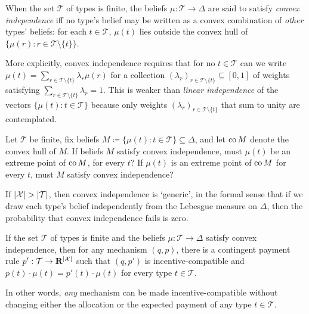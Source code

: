 \begin{definition}
	\label{definition:convex_indep}
	When the set $\mathcal{T}$ of types is finite,
	the beliefs $\mu : \mathcal{T} \to \Delta$
	are said to satisfy \emph{convex independence}
	iff no type's belief may be written as a convex combination of \emph{other} types' beliefs:
	for each $t \in \mathcal{T}$, $\mu(t)$ lies outside the convex hull of $\{ \mu(r) : r \in \mathcal{T} \setminus \{t\} \}$.
\end{definition}

More explicitly, convex independence requires that
for no $t \in \mathcal{T}$
can we write $\mu(t) = \sum_{r \in \mathcal{T} \setminus \{t\}} \lambda_r \mu(r)$
for a collection $( \lambda_r )_{r \in \mathcal{T} \setminus \{t\}} \subseteq [0,1]$ of weights satisfying $\sum_{r \in \mathcal{T} \setminus \{t\}} \lambda_r = 1$.
This is weaker than \emph{linear independence} of the vectors $\{ \mu(t) : t \in \mathcal{T} \}$ because only weights $( \lambda_r )_{r \in \mathcal{T} \setminus \{t\}}$ that sum to unity are contemplated.

\begin{exercise}
	\label{exercise:convex_indep_ext_point}
	Let $\mathcal{T}$ be finite,
	fix beliefs $M \coloneqq \{ \mu(t) : t \in \mathcal{T} \} \subseteq \Delta$,
	and let $\operatorname*{co} M$ denote the convex hull of $M$.
	If beliefs $M$ satisfy convex independence, must $\mu(t)$ be an extreme point of $\operatorname*{co} M$, for every $t$?
	If $\mu(t)$ is an extreme point of $\operatorname*{co} M$ for every $t$, must $M$ satisfy convex independence?
\end{exercise}

If $\abs*{\mathcal{X}} > \abs*{\mathcal{T}}$, then convex independence is `generic', in the formal sense that if we draw each type's belief independently from the Lebesgue measure on $\Delta$, then the probability that convex independence fails is zero.


\begin{theorem}
	\label{theorem:CremerMclean}
	If the set $\mathcal{T}$ of types is finite
	and the beliefs $\mu : \mathcal{T} \to \Delta$
	satisfy convex independence,
	then for any mechanism $(q,p)$,
	there is a contingent payment rule $p' : \mathcal{T} \to \R^{\abs*{\mathcal{X}}}$
	such that $(q,p')$ is incentive-compatible
	and $p(t) \cdot \mu(t) = p'(t) \cdot \mu(t)$ for every type $t \in \mathcal{T}$.
\end{theorem}

In other words, \emph{any} mechanism can be made incentive-compatible
without changing either the allocation or the expected payment of any type $t \in \mathcal{T}$.

